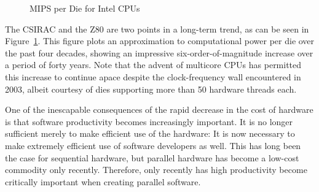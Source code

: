 \begin{figure}[tb]
\centering
{}
\caption{MIPS per Die for Intel CPUs}
\label{fig:intro:MIPS per Die for Intel CPUs}
\end{figure}

The CSIRAC and the Z80 are two points in a long-term trend, as can be
seen in
Figure~\ref{fig:intro:MIPS per Die for Intel CPUs}.
This figure plots an approximation to computational power per die
over the past four decades, showing an impressive six-order-of-magnitude
increase over a period of forty years.
Note that the advent of multicore CPUs has permitted this increase to
continue apace despite the clock-frequency wall encountered in 2003,
albeit courtesy of dies supporting more than 50 hardware threads each.

One of the inescapable consequences of the rapid decrease in
the cost of hardware is that software productivity becomes increasingly
important.
It is no longer sufficient merely to make efficient use of the hardware:
It is now necessary to make extremely efficient use of software
developers as well.
This has long been the case for sequential hardware, but
parallel hardware has become a low-cost commodity only recently.
Therefore, only recently has high productivity become critically important
when creating parallel software.


